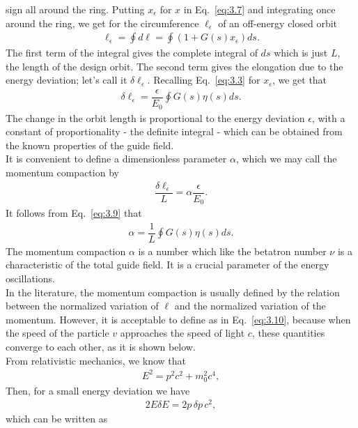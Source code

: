 sign all around the ring. Putting $x_\epsilon$ for $x$ in Eq.~\eqref{eq:3.7} and integrating
once around the ring, we get for the circumference $\ell_\epsilon$ of an off-energy
closed orbit
\begin{align}
	\ell_\epsilon = \oint d\ell = \oint (1 + G(s)x_\epsilon)ds.
\end{align}
The first term of the integral gives the complete integral of $ds$ which is just $L$, the length of the design orbit. The second term gives the elongation due to the energy deviation; let's call it $\delta \ell_\epsilon$. Recalling Eq.~\eqref{eq:3.3} for $x_\epsilon$, we get that
\begin{align} \label{eq:3.9}
	\delta\ell_\epsilon = \dfrac{\epsilon}{E_0} \oint G(s) \eta(s) ds.
\end{align}
The change in the orbit length is proportional to the energy deviation $\epsilon$, with a constant of proportionality - the definite integral - which can be obtained from the known properties of the guide field.\\
It is convenient to define a dimensionless parameter $\alpha$, which we may call the momentum compaction by
\begin{align}\label{eq:3.10}
	\dfrac{\delta \ell_\epsilon}{L} = \alpha \dfrac{\epsilon}{E_0}.
\end{align}
It follows from Eq.~\eqref{eq:3.9} that
\begin{align}\label{eq:3.11}
	\alpha = \dfrac{1}{L} \oint G(s) \eta(s) ds.
\end{align}
The momentum compaction $\alpha$ is a number which like the betatron number $\nu$ is a characteristic of the total guide field. It is a crucial parameter of the energy oscillations.\\
In the literature, the momentum compaction is usually defined by the relation between the normalized variation of $\ell$ and the normalized variation of the momentum. However, it is acceptable to define as in Eq.~\eqref{eq:3.10}, because when the speed of the particle $v$ approaches the speed of light $c$, these quantities converge to each other, as it is shown below.\\
From relativistic mechanics, we know that
\begin{align}\label{eq:}
	E^2 = p^2c^2 + m_0^2 c^4,
\end{align}
Then, for a small energy deviation we have
\begin{align}
	2 E \delta E = 2p \,\delta p \, c^2,
\end{align}
which can be written as
